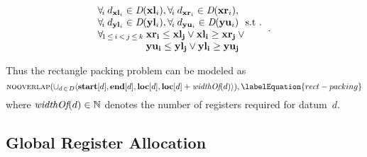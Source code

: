 \begin{definition}
\begin{displaymath}
\begin{array}{c}
{\begin{array}{@{}l@{}}
                       \forall_{\! i} \: d_{\mVar{xl}_i} \in \mDomain(\mVar{xl}_i),
                       \forall_{\! i} \: d_{\mVar{xr}_i} \in \mDomain(\mVar{xr}_i),
                       \\
                       \forall_{\! i} \: d_{\mVar{yl}_i} \in \mDomain(\mVar{yl}_i),
                       \forall_{\! i} \: d_{\mVar{yu}_i} \in \mDomain(\mVar{yu}_i)
                       \text{ \st} \\
                       \begin{array}{@{}r@{\:}l@{}}
                           \forall_{\! 1 \,\leq\, i \,<\, j \,\leq\, k}
                         & \mVar{xr_i} \leq \mVar{xl_j} \mOr
                           \mVar{xl_i} \geq \mVar{xr_j} \mOr \mbox{} \\
                         & \mVar{yu_i} \leq \mVar{yl_j} \mOr
                           \mVar{yl_i} \geq \mVar{yu_j}
                       \end{array}
                     \end{array}
                   }\!.
    \end{array}
  \end{displaymath}
\end{definition}
%
Thus the rectangle packing problem can be modeled as
%
\begin{equation}
  \mNoOverlap\!
  \left(
    \cup_{d \,\in\, \mDataSet}
      \mTuple{
         \mVar{start}[d],
         \mVar{end}[d],
         \mVar{loc}[d],
         \mVar{loc}[d] + \mWidthOf(d)
      }
  \right)\!,
  \labelEquation{rect-packing}
\end{equation}
%
where \mbox{$\operatorname{\textit{widthOf}}(d) \in \mathbb{N}$} denotes the number of
\glspl{register} required for \gls{datum}~$d$\hspace{-1pt}.


\subsection{Global Register Allocation}

